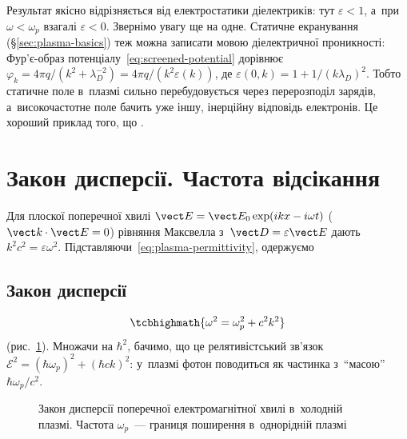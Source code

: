 Результат якісно відрізняється від електростатики діелектриків: тут $\varepsilon<1$, а~при
$\omega<\omega_p$ взагалі $\varepsilon<0$. Звернімо увагу ще на одне. Статичне екранування
(§\ref{sec:plasma-basics}) теж можна записати мовою діелектричної проникності: Фур'є-образ
потенціалу~\eqref{eq:screened-potential} дорівнює $\varphi_k=4\pi
q/(k^2+\lambda_D^{-2})=4\pi q/(k^2\varepsilon(k))$, де
$\varepsilon(0,k)=1+1/(k\lambda_D)^2$. Тобто статичне поле в~плазмі сильно перебудовується
через перерозподіл зарядів, а~високочастотне поле бачить уже іншу, інерційну відповідь
електронів. Це хороший приклад того, що .



\section{Закон дисперсії. Частота відсікання}



Для плоскої поперечної хвилі $\vect E=\vect E_0\exp(ikx-i\omega t)$ ($\vect k\cdot\vect
E=0$) рівняння Максвелла з~$\vect D=\varepsilon\vect E$ дають
$k^2c^2=\varepsilon\omega^2$. Підставляючи~\eqref{eq:plasma-permittivity}, одержуємо



\subsection{Закон дисперсії}



\begin{equation}\label{eq:plasma-dispersion}
	\tcbhighmath{\omega^2=\omega_p^2+c^2k^2}
\end{equation}
(рис.~\ref{pic:plasma-dispersion}). Множачи на $\hbar^2$, бачимо, що це релятивістський
зв'язок $\mathcal E^2=(\hbar\omega_p)^2+(\hbar ck)^2$: у~плазмі фотон поводиться як
частинка з~\enquote{масою} $\hbar\omega_p/c^2$.

\begin{figure}[h!]\centering
	\caption{Закон дисперсії поперечної електромагнітної хвилі в~холодній плазмі. Частота
	$\omega_p$~--- границя поширення в~однорідній плазмі}
	\label{pic:plasma-dispersion}
\end{figure}

